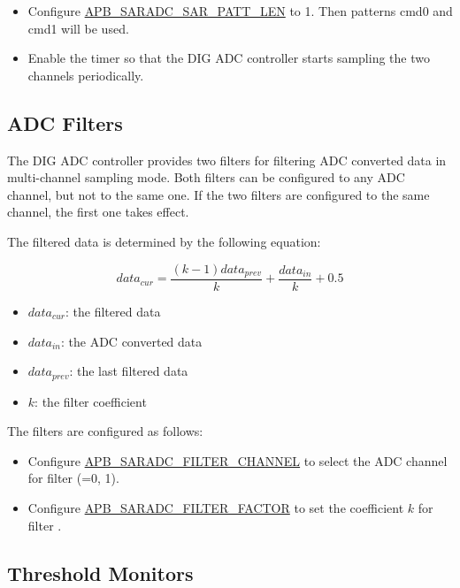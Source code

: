 \documentclass[main\_\_EN.tex]{subfiles}
\begin{document}
\begin{itemize}
    \item Configure \hyperref[fielddesc:APBSARADCSARPATTLEN]{APB\_SARADC\_SAR\_PATT\_LEN} to 1. Then patterns cmd0 and cmd1 will be used. 
    \item Enable the timer so that the DIG ADC controller starts sampling the two channels periodically.
\end{itemize}

\subsection{ADC Filters}\label{sec:adc_filter}

The DIG ADC controller provides two filters for filtering ADC converted data in multi-channel sampling mode. Both filters can be configured to any ADC channel, but not to the same one. If the two filters are configured to the same channel, the first one takes effect.

The filtered data is determined by the following equation:

\[data_{cur} = \frac{(k-1)data_{prev}}{k}+\frac{data_{in}}{k}+0.5\]

\begin{itemize}
    \item \(data_{cur}\): the filtered data
    \item \(data_{in}\): the ADC converted data
    \item \(data_{prev}\): the last filtered data
    \item \(k\): the filter coefficient
\end{itemize}

The filters are configured as follows:

\begin{itemize}
\item Configure \hyperref[fielddesc:APBSARADCFILTERCHANNEL1]{APB\_SARADC\_FILTER\_CHANNEL} to select the ADC channel for filter  (=0, 1).
\item Configure \hyperref[fielddesc:APBSARADCFILTERFACTOR1]{APB\_SARADC\_FILTER\_FACTOR} to set the coefficient \(k\) for filter .
\end{itemize}

\subsection{Threshold Monitors}\label{sec:adc_threshold}
\end{document}
